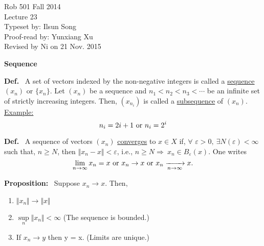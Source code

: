 \documentclass[letterpaper]{article}
\begin{document}
\baselineskip=48pt  %


\setlength{\parskip}{.3in}
\setlength{\itemsep}{.3in}

\pagestyle{plain}

{\Large \bf
\begin{center}
Rob 501 Fall 2014\\
Lecture 23\\
Typeset by:  Ilsun Song\\
Proof-read by: Yunxiang Xu\\
Revised by Ni on 21 Nov. 2015
\end{center}
}


\Large

\begin{center}
    \textbf{Sequence}
\end{center}

\noindent \textbf{Def.}~ A set of vectors indexed by the non-negative integers is called a \underline{sequence} $(x_n)$ or $\{x_n\}$. Let $(x_n)$ be a sequence and $n_1<n_2<n_3<\dotsb $ be an infinite set of strictly increasing integers. Then, $(x_{n_i})$ is called a \underline{subsequence} of $(x_n)$.\\
    \underline{Example:}
    \begin{equation*}
        n_i = 2i + 1\textnormal{ or }n_i = 2^i
    \end{equation*}


\noindent \textbf{Def.}~ A sequence of vectors $(x_n)$ \underline{converges} to $x\in X$ if, $\forall$ ${\varepsilon} > 0,\ {\exists} N({\varepsilon}) < {\infty}$ such that, $n{\geq}N$, then ${\Vert}x_n-x{\Vert} < {\varepsilon}$, i.e., $n {\geq}N\Rightarrow \ x_n {\in} B_{\varepsilon}(x).$ One writes
    \begin{equation*}
        \lim\limits_{n \to \infty} x_n= x\textnormal{ or }x_n \rightarrow  x\textnormal{ or }x_n  \xrightarrow[n \to \infty]{} x.
    \end{equation*}

\noindent \textbf{Proposition:}~  Suppose $x_n \rightarrow x $. Then,
    \begin{enumerate}
        \item $\Vert x_n \Vert \rightarrow \Vert x \Vert$
        \item $\sup\limits_{n}\Vert x_n \Vert < \infty$ (The sequence is bounded.)
        \item If $x_n \rightarrow y$ then y = x. (Limits are unique.)
    \end{enumerate}
\end{document}
